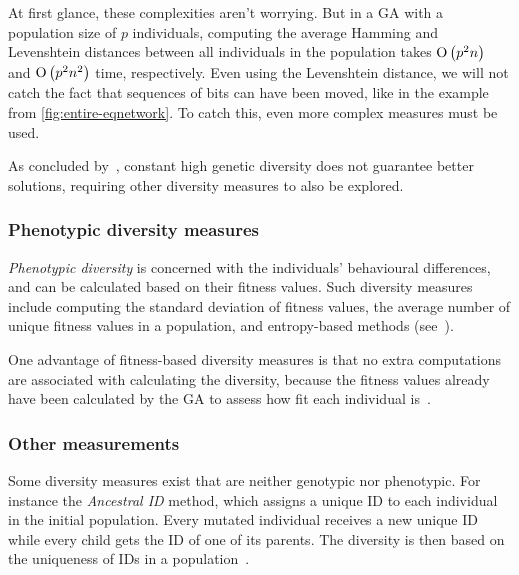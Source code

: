 At first glance, these complexities aren't worrying. But in a GA with a population size of $p$ individuals, computing the average Hamming and Levenshtein distances between all individuals in the population takes $\operatorname{O}\left(p^2 n\right)$ and $\operatorname{O}\left(p^2 n^2\right)$ time, respectively. Even using the Levenshtein distance, we will not catch the fact that sequences of bits can have been moved, like in the example from \cref{fig:entire-eqnetwork}. To catch this, even more complex measures must be used.

As concluded by~\cite{Darwen00doesextra}, constant high genetic diversity does not guarantee better solutions, requiring other diversity measures to also be explored.

\subsubsection{Phenotypic diversity measures}
\emph{Phenotypic diversity} is concerned with the individuals' behavioural differences, and can be calculated based on their fitness values. Such diversity measures include computing the standard deviation of fitness values, the average number of unique fitness values in a population, and entropy-based methods (see~\cite{1250187, 1266373}).

One advantage of fitness-based diversity measures is that no extra computations are associated with calculating the diversity, because the fitness values already have been calculated by the GA to assess how fit each individual is~\cite{Nguyen:2006:ASPGP}.

\subsubsection{Other measurements}
Some diversity measures exist that are neither genotypic nor phenotypic. For instance the \emph{Ancestral ID} method, which assigns a unique ID to each individual in the initial population. Every mutated individual receives a new unique ID while every child gets the ID of one of its parents. The diversity is then based on the uniqueness of IDs in a population~\cite{1250187}.

